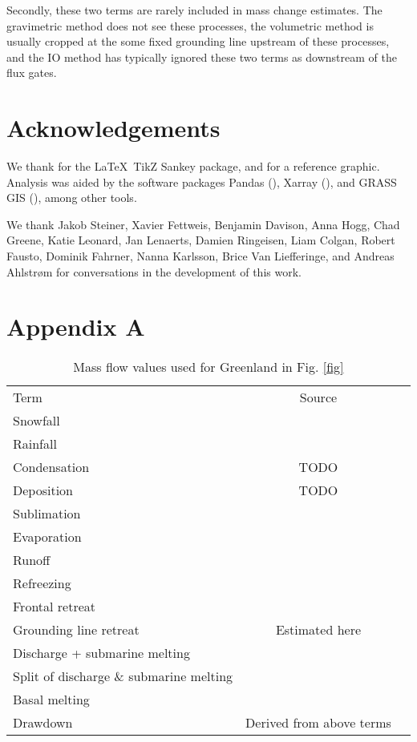 \documentclass[jog]{igs}
\begin{document}
  Secondly, these two terms are rarely included in mass change estimates. The gravimetric method does not see these processes, the volumetric method is usually cropped at the some fixed grounding line upstream of these processes, and the IO method has typically ignored these two terms as downstream of the flux gates.
  
\section{Acknowledgements}

We thank \citep{sankey} for the \LaTeX\ TikZ Sankey package, and \citet{cogley_2011} for a reference graphic. Analysis was aided by the software packages Pandas (\citet{pandas_team}), Xarray (\citet{xarray}), and GRASS GIS (\citet{GRASS}), among other tools.

We thank Jakob Steiner, Xavier Fettweis, Benjamin Davison, Anna Hogg, Chad Greene, Katie Leonard, Jan Lenaerts, Damien Ringeisen, Liam Colgan, Robert Fausto, Dominik Fahrner, Nanna Karlsson, Brice Van Liefferinge, and Andreas Ahlstrøm for conversations in the development of this work.




\appendix
\section{Appendix A}
\label{sec:appendix:A}


\begin{table*}
\caption{Mass flow values used for Greenland in Fig. \ref{fig}}
\label{tab:gl}
\begin{tabular}{@{}lcc}\hline
  Term & Source\\
  Snowfall & \citet{fettweis_2020}\\
  Rainfall & \citet{fettweis_2020}\\
  Condensation & TODO\\
  Deposition & TODO\\
  Sublimation & \citet{fettweis_2020}\\
  Evaporation & \citet{fettweis_2020}\\
  Runoff & \citet{fettweis_2020}\\
  Refreezing & \citet{fettweis_2020}\\
  Frontal retreat & \citet{kochtitzky_2023,greene_2024}\\
  Grounding line retreat & Estimated here\\
  Discharge + submarine melting & \citet{mankoff_2020_solid}\\
  Split of discharge \& submarine melting & \citet{enderlin_2013}\\
  Basal melting & \citet{karlsson_2021}\\
  Drawdown & Derived from above terms
\end{tabular}
\end{table*}
\end{document}

